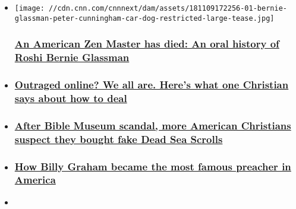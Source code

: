 \begin{itemize}
\item
  \href{/2018/11/30/us/bernie-glassman-american-zen-master/index.html}{}

  \texttt{[image: //cdn.cnn.com/cnnnext/dam/assets/181109172256-01-bernie-glassman-peter-cunningham-car-dog-restricted-large-tease.jpg]}

  \hypertarget{an-american-zen-master-has-died-an-oral-history-of-roshi-bernie-glassman}{%
  \subsubsection{\texorpdfstring{\href{/2018/11/30/us/bernie-glassman-american-zen-master/index.html}{An
  American Zen Master has died: An oral history of Roshi Bernie
  Glassman}}{An American Zen Master has died: An oral history of Roshi Bernie Glassman}}\label{an-american-zen-master-has-died-an-oral-history-of-roshi-bernie-glassman}}
\item
  \hypertarget{outraged-online-we-all-are-heres-what-one-christian-says-about-how-to-deal}{%
  \subsubsection{\texorpdfstring{\href{/2018/10/16/us/stetzer-christian-outrage/index.html}{Outraged
  online? We all are. Here's what one Christian says about how to
  deal}}{Outraged online? We all are. Here's what one Christian says about how to deal}}\label{outraged-online-we-all-are-heres-what-one-christian-says-about-how-to-deal}}
\item
  \hypertarget{after-bible-museum-scandal-more-american-christians-suspect-they-bought-fake-dead-sea-scrolls-}{%
  \subsubsection{\texorpdfstring{\href{/2018/10/26/us/evangelicals-dead-sea-scrolls/index.html}{After
  Bible Museum scandal, more American Christians suspect they bought
  fake Dead Sea Scrolls
  }}{After Bible Museum scandal, more American Christians suspect they bought fake Dead Sea Scrolls }}\label{after-bible-museum-scandal-more-american-christians-suspect-they-bought-fake-dead-sea-scrolls-}}
\item
  \hypertarget{how-billy-graham-became-the-most-famous-preacher-in-america}{%
  \subsubsection{\texorpdfstring{\href{/2018/02/21/us/how-billy-graham-became-famous/index.html}{How
  Billy Graham became the most famous preacher in
  America}}{How Billy Graham became the most famous preacher in America}}\label{how-billy-graham-became-the-most-famous-preacher-in-america}}
\item
  \hypertarget{seeing-the-pope-help-strangers-made-me-tear-up-later-i-learned-why-}{%
}
\end{itemize}
